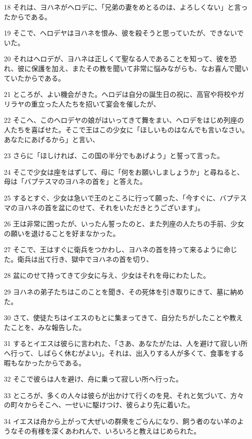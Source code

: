 \par 18 それは、ヨハネがヘロデに、「兄弟の妻をめとるのは、よろしくない」と言ったからである。
\par 19 そこで、ヘロデヤはヨハネを恨み、彼を殺そうと思っていたが、できないでいた。
\par 20 それはヘロデが、ヨハネは正しくて聖なる人であることを知って、彼を恐れ、彼に保護を加え、またその教を聞いて非常に悩みながらも、なお喜んで聞いていたからである。
\par 21 ところが、よい機会がきた。ヘロデは自分の誕生日の祝に、高官や将校やガリラヤの重立った人たちを招いて宴会を催したが、
\par 22 そこへ、このヘロデヤの娘がはいってきて舞をまい、ヘロデをはじめ列座の人たちを喜ばせた。そこで王はこの少女に「ほしいものはなんでも言いなさい。あなたにあげるから」と言い、
\par 23 さらに「ほしければ、この国の半分でもあげよう」と誓って言った。
\par 24 そこで少女は座をはずして、母に「何をお願いしましょうか」と尋ねると、母は「バプテスマのヨハネの首を」と答えた。
\par 25 するとすぐ、少女は急いで王のところに行って願った、「今すぐに、バプテスマのヨハネの首を盆にのせて、それをいただきとうございます」。
\par 26 王は非常に困ったが、いったん誓ったのと、また列座の人たちの手前、少女の願いを退けることを好まなかった。
\par 27 そこで、王はすぐに衛兵をつかわし、ヨハネの首を持って来るように命じた。衛兵は出て行き、獄中でヨハネの首を切り、
\par 28 盆にのせて持ってきて少女に与え、少女はそれを母にわたした。
\par 29 ヨハネの弟子たちはこのことを聞き、その死体を引き取りにきて、墓に納めた。
\par 30 さて、使徒たちはイエスのもとに集まってきて、自分たちがしたことや教えたことを、みな報告した。
\par 31 するとイエスは彼らに言われた、「さあ、あなたがたは、人を避けて寂しい所へ行って、しばらく休むがよい」。それは、出入りする人が多くて、食事をする暇もなかったからである。
\par 32 そこで彼らは人を避け、舟に乗って寂しい所へ行った。
\par 33 ところが、多くの人々は彼らが出かけて行くのを見、それと気づいて、方々の町々からそこへ、一せいに駆けつけ、彼らより先に着いた。
\par 34 イエスは舟から上がって大ぜいの群衆をごらんになり、飼う者のない羊のようなその有様を深くあわれんで、いろいろと教えはじめられた。
